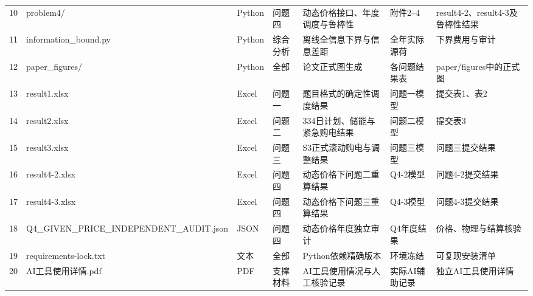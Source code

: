 \begin{longtable}{@{}C{0.04\textwidth}p{0.20\textwidth}C{0.065\textwidth}C{0.085\textwidth}p{0.175\textwidth}p{0.12\textwidth}p{0.18\textwidth}@{}}
10 & {\raggedright problem4/\par} & Python & 问题四 & 动态价格接口、年度调度与鲁棒性 & 附件2--4 & result4-2、result4-3及鲁棒性结果 \\
11 & {\raggedright information\_\allowbreak{}bound.py\par} & Python & 综合分析 & 离线全信息下界与信息差距 & 全年实际源荷 & 下界费用与审计 \\
12 & {\raggedright paper\_\allowbreak{}figures/\par} & Python & 全部 & 论文正式图生成 & 各问题结果表 & paper/figures中的正式图 \\
13 & {\raggedright result1.xlsx\par} & Excel & 问题一 & 题目格式的确定性调度结果 & 问题一模型 & 提交表1、表2 \\
14 & {\raggedright result2.xlsx\par} & Excel & 问题二 & 334日计划、储能与紧急购电结果 & 问题二模型 & 提交表3 \\
15 & {\raggedright result3.xlsx\par} & Excel & 问题三 & S3正式滚动购电与调整结果 & 问题三模型 & 问题三提交结果 \\
16 & {\raggedright result4-2.xlsx\par} & Excel & 问题四 & 动态价格下问题二重算结果 & Q4-2模型 & 问题4-2提交结果 \\
17 & {\raggedright result4-3.xlsx\par} & Excel & 问题四 & 动态价格下问题三重算结果 & Q4-3模型 & 问题4-3提交结果 \\
18 & {\raggedright Q4\_\allowbreak{}GIVEN\_\allowbreak{}PRICE\_\allowbreak{}INDEPENDENT\_\allowbreak{}AUDIT.json\par} & JSON & 问题四 & 动态价格年度独立审计 & Q4年度结果 & 价格、物理与结算核验 \\
19 & {\raggedright requirements-lock.txt\par} & 文本 & 全部 & Python依赖精确版本 & 环境冻结 & 可复现安装清单 \\
20 & {\raggedright AI工具使用详情.pdf\par} & PDF & 支撑材料 & AI工具使用情况与人工核验记录 & 实际AI辅助记录 & 独立AI工具使用详情 \\
\bottomrule
\end{longtable}
\endgroup
